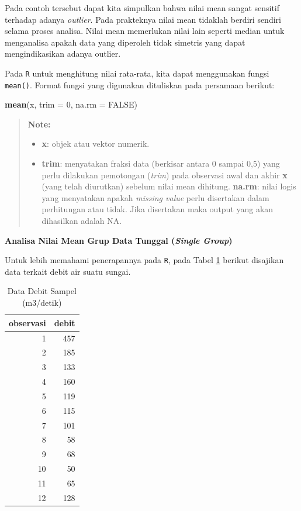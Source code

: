 \documentclass[]{book}
\newenvironment{Shaded}{\begin{snugshade}}{\end{snugshade}}
\newcommand{\KeywordTok}[1]{\textcolor[rgb]{0.13,0.29,0.53}{\textbf{#1}}}
\newcommand{\DataTypeTok}[1]{\textcolor[rgb]{0.13,0.29,0.53}{#1}}
\newcommand{\DecValTok}[1]{\textcolor[rgb]{0.00,0.00,0.81}{#1}}
\newcommand{\OtherTok}[1]{\textcolor[rgb]{0.56,0.35,0.01}{#1}}
\newcommand{\NormalTok}[1]{#1}
\providecommand{\tightlist}{%
  \setlength{\itemsep}{0pt}\setlength{\parskip}{0pt}}
\begin{document}
Pada contoh tersebut dapat kita simpulkan bahwa nilai mean sangat
sensitif terhadap adanya \emph{outlier}. Pada prakteknya nilai mean
tidaklah berdiri sendiri selama proses analisa. Nilai mean memerlukan
nilai lain seperti median untuk menganalisa apakah data yang diperoleh
tidak simetris yang dapat mengindikasikan adanya outlier.

Pada \texttt{R} untuk menghitung nilai rata-rata, kita dapat menggunakan
fungsi \texttt{mean()}. Format fungsi yang digunakan dituliskan pada
persamaan berikut:

\begin{Shaded}
\begin{Highlighting}[]
\KeywordTok{mean}\NormalTok{(x, }\DataTypeTok{trim =} \DecValTok{0}\NormalTok{, }\DataTypeTok{na.rm =} \OtherTok{FALSE}\NormalTok{)}
\end{Highlighting}
\end{Shaded}

\begin{quote}
\textbf{Note:}

\begin{itemize}
\tightlist
\item
  \textbf{x}: objek atau vektor numerik.
\item
  \textbf{trim}: menyatakan fraksi data (berkisar antara 0 sampai 0,5)
  yang perlu dilakukan pemotongan (\emph{trim}) pada observasi awal dan
  akhir \textbf{x} (yang telah diurutkan) sebelum nilai mean dihitung.
  \textbf{na.rm}: nilai logis yang menyatakan apakah \emph{missing
  value} perlu disertakan dalam perhitungan atau tidak. Jika disertakan
  maka output yang akan dihasilkan adalah NA.
\end{itemize}
\end{quote}

\textbf{Analisa Nilai Mean Grup Data Tunggal (\emph{Single Group})}

Untuk lebih memahami penerapannya pada \texttt{R}, pada Tabel
\ref{tab:debitsungai} berikut disajikan data terkait debit air suatu
sungai.

\begin{table}[t]

\caption{\label{tab:debitsungai}Data Debit Sampel (m3/detik)}
\centering
\begin{tabular}{r|r}
\hline
observasi & debit\\
\hline
1 & 457\\
\hline
2 & 185\\
\hline
3 & 133\\
\hline
4 & 160\\
\hline
5 & 119\\
\hline
6 & 115\\
\hline
7 & 101\\
\hline
8 & 58\\
\hline
9 & 68\\
\hline
10 & 50\\
\hline
11 & 65\\
\hline
12 & 128\\
\hline
\end{tabular}
\end{table}
\end{document}
